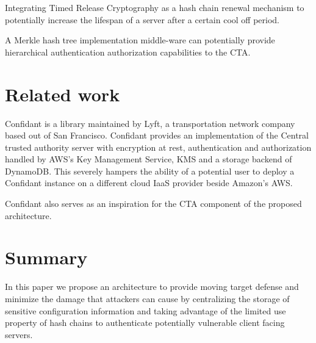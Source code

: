 \documentclass{sig-alternate-05-2015}
\begin{document}
Integrating Timed Release Cryptography \cite{chalkias_timed_2006} as a hash chain renewal mechanism to potentially increase the lifespan of a server after a certain cool off period.

A Merkle hash tree implementation middle-ware can potentially provide hierarchical authentication authorization \cite{yi_cloud_2012} capabilities to the CTA.

\section*{Related work}

Confidant \cite{lyft_confidant:_2015} is a library maintained by Lyft, a transportation network company based out of San Francisco. Confidant provides an implementation of the Central trusted authority server with encryption at rest, authentication and authorization handled by AWS's Key Management Service, KMS and a storage backend of DynamoDB. This severely hampers the ability of a potential user to deploy a Confidant instance on a different cloud IaaS provider beside Amazon's AWS. 

Confidant also serves as an inspiration for the CTA component of the proposed architecture.

\section*{Summary}

In this paper we propose an architecture to provide moving target defense and minimize the damage that attackers can cause by centralizing the storage of sensitive configuration information and taking advantage of the limited use property of hash chains to authenticate potentially vulnerable client facing servers. 





%
%
\end{document}
